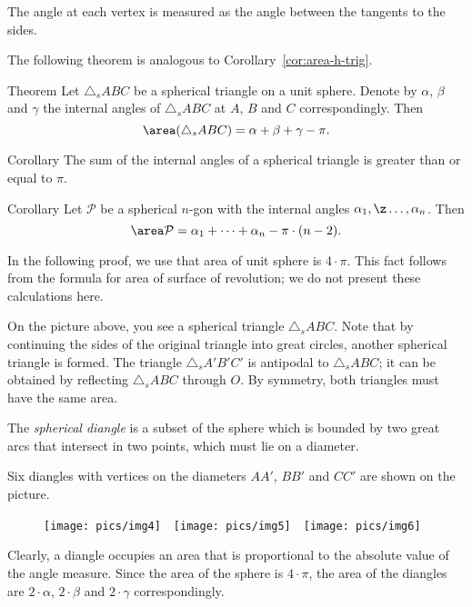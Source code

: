 {The angle at each vertex is measured 
as the angle between the tangents to the sides.

The following theorem is analogous to Corollary~\ref{cor:area-h-trig}.

\begin{thm}{Theorem}\label{thm:s-trig-area}
Let $\triangle_s ABC$ be a spherical triangle on a unit sphere.
Denote by $\alpha$, $\beta$ and $\gamma$ the internal angles of $\triangle_s ABC$ 
at $A$, $B$ and $C$ correspondingly.
Then
$$\area (\triangle_s ABC) = \alpha+\beta+\gamma-\pi.$$

\end{thm}

\begin{thm}{Corollary}
The sum of the internal angles of a spherical
triangle is greater than or equal to $\pi$.
\end{thm}

\begin{thm}{Corollary}
Let $\mathcal{P}$ be a spherical $n$-gon 
with the internal angles $\alpha_1,\z\dots,\alpha_n$.
Then 
$$\area\mathcal{P}=\alpha_1+\dots+\alpha_n-\pi\cdot(n-2).$$

\end{thm}

In the following proof, we use that area of unit sphere is $4\cdot\pi$.
This fact follows from the formula for area of surface of revolution;
we do not present these calculations here.

On the picture above, you see a spherical triangle $\triangle_sABC$.
Note that by continuing the sides of the original triangle into
great circles, another spherical triangle is formed. The triangle $\triangle_sA'B'C'$
is antipodal to $\triangle_sABC$; it can be obtained by reflecting $\triangle_sABC$ through $O$. 
By symmetry, both triangles must
have the same area.

The \emph{spherical diangle} is a subset of the sphere which is bounded by two great arcs that intersect in two points, which must lie on a diameter. 

Six diangles
with vertices on the diameters $AA'$, $BB'$ and $CC'$ are shown on the picture.

\begin{figure}[h]
\texttt{[image: pics/img4]}\ \ 
\texttt{[image: pics/img5]}\ \ 
\texttt{[image: pics/img6]}
\end{figure}

Clearly, a diangle occupies an area that is proportional to the absolute value of the angle measure. 
Since the area of the sphere
is $4\cdot\pi$, 
the area of the diangles are $2\cdot\alpha$, $2\cdot\beta$ and $2\cdot\gamma$ correspondingly.

}

